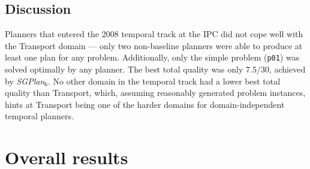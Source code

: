 \subsection{Discussion}

Planners that entered the 2008 temporal track at the IPC did not cope well with the Transport domain
--- only two non-baseline planners were able to produce at least one plan
for any problem. Additionally, only the simple problem (\verb+p01+) was solved
optimally by any planner. The best total quality was only $7.5/30$, achieved by
\textit{SGPlan$_6$}. No other domain in the temporal track had a lower best total quality
than Transport, which, assuming reasonably generated problem instances, hints
at Transport being one of the harder domains for domain-independent temporal planners.



\section{Overall results}

